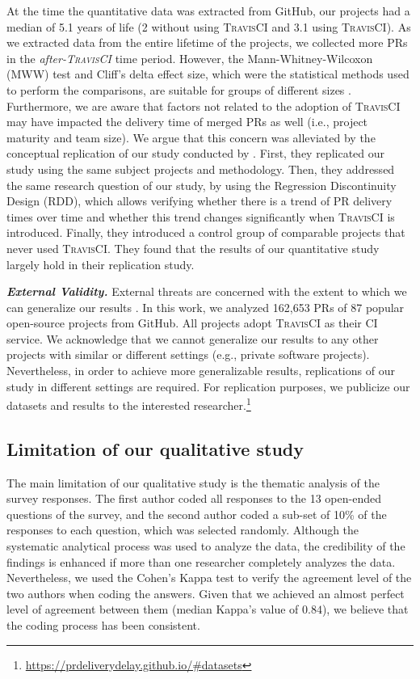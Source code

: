At the time the quantitative data was extracted from GitHub, our projects had a median of 5.1 years of life (2 without using \textsc{TravisCI} and 3.1 using \textsc{TravisCI}). As we extracted data from the entire lifetime of the projects, we collected more PRs in the \textit{after-\textsc{TravisCI}} time period. However, the Mann-Whitney-Wilcoxon (MWW) test and Cliff's delta effect size, which were the statistical methods used to perform the comparisons, are suitable for groups of different sizes \citep{mann_whitney_1947}. 
Furthermore, we are aware that factors not related to the adoption of \textsc{TravisCI} may have impacted the delivery time of merged PRs as well (i.e., project maturity and team size). We argue that this concern was alleviated by the conceptual replication of our study conducted by \cite{guo2019studying}. First, they replicated our study using the same subject projects and methodology. Then, they addressed the same research question of our study, by using the Regression Discontinuity Design (RDD), which allows verifying whether there is a trend of PR delivery times over time and whether this trend changes significantly when \textsc{TravisCI} is introduced. Finally, they introduced a control group of comparable projects that never used \textsc{TravisCI}. They found that the results of our quantitative study largely hold in their replication study.

\noindent\textit{\textbf{External Validity.}} External threats are concerned with the extent to which we can generalize our results \citep{Perry:2000:ESS:336512.336586}. 
In this work, we analyzed 162,653 PRs of 87 popular open-source projects from GitHub. All projects adopt \textsc{TravisCI} as their CI service. 
We acknowledge that we cannot generalize our results to any other projects with similar or different settings (e.g., private software projects). Nevertheless, in order to achieve more generalizable results, replications of our study in different settings are required. 
For replication purposes, we publicize our datasets and results to the interested researcher.\footnote{\url{https://prdeliverydelay.github.io/\#datasets}}  

\subsection{\textbf{Limitation of our qualitative study}}

The main limitation of our qualitative study is the thematic analysis of the survey responses. The first author coded all responses to the 13 open-ended questions of the survey, and the second author coded a sub-set of 10\% of the responses to each question, which was selected randomly. Although the systematic analytical process was used to analyze the data, the credibility of the findings is enhanced if more than one researcher completely analyzes the data. Nevertheless, we used the Cohen's Kappa test to verify the agreement level of the two authors when coding the answers. Given that we achieved an almost perfect level of agreement between them (median Kappa's value of $0.84$), we believe that the coding process has been consistent. 

